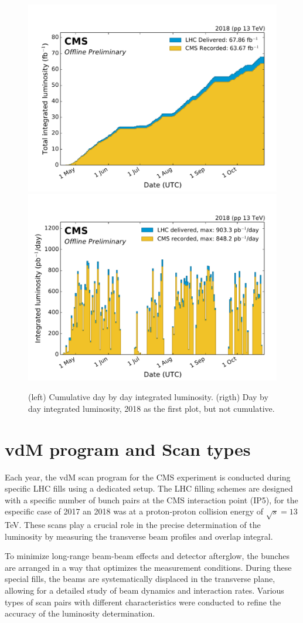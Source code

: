 \begin{center}
  \begin{figure}[h!]
    \centering
    \includegraphics[width=.45\textwidth]{Chapter3/Luminosity/int_lumi_per_day_cumulative_pp_2018_Normtag.pdf}
    \includegraphics[width=.45\textwidth]{Chapter3/Luminosity/int_lumi_per_day_pp_2018_Normtag.pdf}
    \caption[Cumulative day-by-day integrated luminosity in 2022]{(left) Cumulative day by day integrated luminosity. (rigth) Day by day integrated luminosity, 2018 as the first plot, but not cumulative.} 
    \label{Lumi_2018}
  \end{figure}
\end{center}






\section{vdM program and Scan types}
\label{vdM program and Scan types}

Each year, the vdM scan program for the CMS experiment is conducted during specific LHC fills using a dedicated setup. The LHC filling schemes are designed with a specific number of bunch pairs at the CMS interaction point (IP5), for the especific case of 2017 an 2018 was at a proton-proton collision energy of \(\sqrt{s} = 13\) TeV. These scans play a crucial role in the precise determination of the luminosity by measuring the transverse beam profiles and overlap integral.  

To minimize long-range beam-beam effects and detector afterglow, the bunches are arranged in a way that optimizes the measurement conditions. During these special fills, the beams are systematically displaced in the transverse plane, allowing for a detailed study of beam dynamics and interaction rates. Various types of scan pairs with different characteristics were conducted to refine the accuracy of the luminosity determination.  


